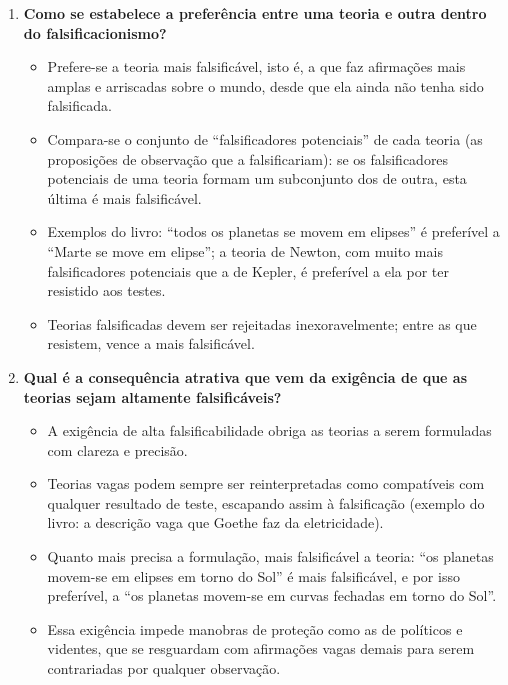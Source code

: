 \documentclass[10pt,a4paper]{extarticle}
\begin{document}
\begin{enumerate}[label=\textbf{\arabic*.}, itemsep=10pt]
\item \textbf{Como se estabelece a preferência entre uma teoria e outra dentro do falsificacionismo?}
\begin{itemize}
  \item Prefere-se a teoria mais falsificável, isto é, a que faz afirmações mais amplas e arriscadas sobre o mundo, desde que ela ainda não tenha sido falsificada.
  \item Compara-se o conjunto de \enquote{falsificadores potenciais} de cada teoria (as proposições de observação que a falsificariam): se os falsificadores potenciais de uma teoria formam um subconjunto dos de outra, esta última é mais falsificável.
  \item Exemplos do livro: \enquote{todos os planetas se movem em elipses} é preferível a \enquote{Marte se move em elipse}; a teoria de Newton, com muito mais falsificadores potenciais que a de Kepler, é preferível a ela por ter resistido aos testes.
  \item Teorias falsificadas devem ser rejeitadas inexoravelmente; entre as que resistem, vence a mais falsificável.
\end{itemize}

\item \textbf{Qual é a consequência atrativa que vem da exigência de que as teorias sejam altamente falsificáveis?}
\begin{itemize}
  \item A exigência de alta falsificabilidade obriga as teorias a serem formuladas com clareza e precisão.
  \item Teorias vagas podem sempre ser reinterpretadas como compatíveis com qualquer resultado de teste, escapando assim à falsificação (exemplo do livro: a descrição vaga que Goethe faz da eletricidade).
  \item Quanto mais precisa a formulação, mais falsificável a teoria: \enquote{os planetas movem-se em elipses em torno do Sol} é mais falsificável, e por isso preferível, a \enquote{os planetas movem-se em curvas fechadas em torno do Sol}.
  \item Essa exigência impede manobras de proteção como as de políticos e videntes, que se resguardam com afirmações vagas demais para serem contrariadas por qualquer observação.
\end{itemize}


\end{enumerate}
\end{document}
